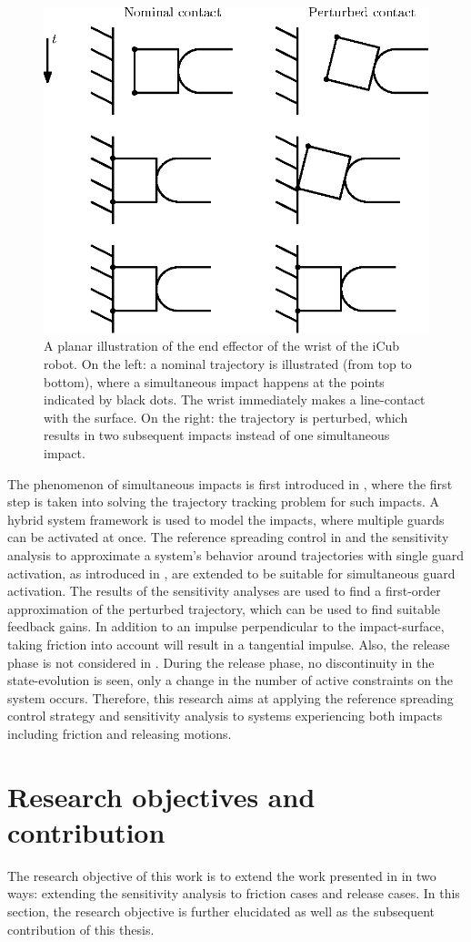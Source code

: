 \documentclass[../DC2019003Bouma.tex]{subfiles}
\begin{document}
\begin{figure}[hbt!]
\centering
\includegraphics[width=.45\textwidth]{simultaneous.eps}\caption{A planar illustration of the end effector of the wrist of the iCub robot. On the left: a nominal trajectory is illustrated (from top to bottom), where a simultaneous impact happens at the points indicated by black dots. The wrist immediately makes a line-contact with the surface. On the right: the trajectory is perturbed, which results in two subsequent impacts instead of one simultaneous impact.}\label{fig:simultaneous}
\end{figure}

The phenomenon of simultaneous impacts is first introduced in \cite{Chen2018a}, where the first step is taken into solving the trajectory tracking problem for such impacts. A hybrid system framework is used to model the impacts, where multiple guards can be activated at once. The reference spreading control in \cite{Rijnen2016,Rijnen2017} and the sensitivity analysis to approximate a system's behavior around trajectories with single guard activation, as introduced in \cite{Saccon2014}, are extended to be suitable for simultaneous guard activation. The results of the sensitivity analyses are used to find a first-order approximation of the perturbed trajectory, which can be used to find suitable feedback gains. In addition to an impulse perpendicular to the impact-surface, taking friction into account will result in a tangential impulse. Also, the release phase is not considered in \cite{Chen2018a}. During the release phase, no discontinuity in the state-evolution is seen, only a change in the number of active constraints on the system occurs. Therefore, this research aims at applying the reference spreading control strategy and sensitivity analysis to systems experiencing both impacts including friction and releasing motions.

\section{Research objectives and contribution}\label{sec:1resobj}
The research objective of this work is to extend the work presented in \cite{Rijnen2018a} in two ways: extending the sensitivity analysis to friction cases and release cases. In this section, the research objective is further elucidated as well as the subsequent contribution of this thesis.
\end{document}

